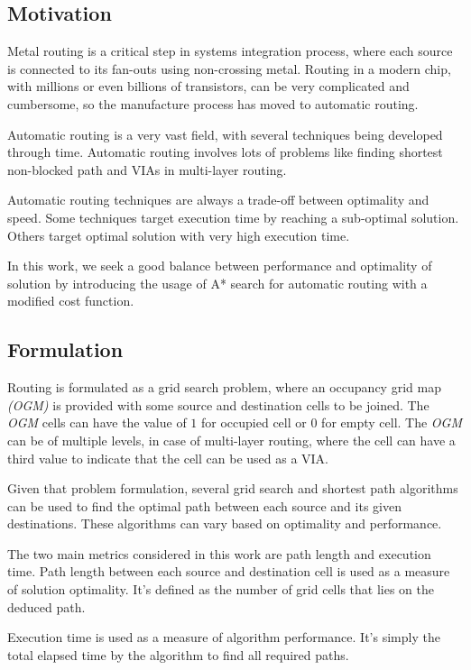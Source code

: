 \subsection{Motivation}
Metal routing is a critical step in systems integration process, where each source is connected to its fan-outs using non-crossing metal. Routing in a modern chip, with millions or even billions of transistors, can be very complicated and cumbersome, so the manufacture process has moved to automatic routing. 

Automatic routing is a very vast field, with several techniques being developed through time. Automatic routing involves lots of problems like finding shortest non-blocked path and VIAs in multi-layer routing. 

Automatic routing techniques are always a trade-off between optimality and speed. Some techniques target execution time by reaching a sub-optimal solution. Others target optimal solution with very high execution time.

In this work, we seek a good balance between performance and optimality of solution by introducing the usage of A* search for automatic routing with a modified cost function.

\subsection{Formulation}
Routing is formulated as a grid search problem, where an occupancy grid map \emph{(OGM)} is provided with some source and destination cells to be joined. The \emph{OGM} cells can have the value of $1$ for occupied cell or $0$ for empty cell. The \emph{OGM} can be of multiple levels, in case of multi-layer routing, where the cell can have a third value to indicate that the cell can be used as a VIA. 

Given that problem formulation, several grid search and shortest path algorithms can be used to find the optimal path between each source and its given destinations. These algorithms can vary based on optimality and performance.

The two main metrics considered in this work are path length and execution time. Path length between each source and destination cell is used as a measure of solution optimality. It's defined as the number of grid cells that lies on the deduced path.

Execution time is used as a measure of algorithm performance. It's simply the total elapsed time by the algorithm to find all required paths.


